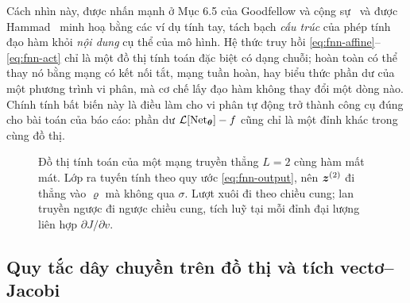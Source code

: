 Cách nhìn này, được nhấn mạnh ở Mục 6.5 của Goodfellow và cộng
sự~\cite{goodfellow2016} và được Hammad~\cite{hammad2024} minh hoạ bằng các ví
dụ tính tay, tách bạch \emph{cấu trúc} của phép tính đạo hàm khỏi \emph{nội
dung} cụ thể của mô hình. Hệ thức truy hồi
\eqref{eq:fnn-affine}--\eqref{eq:fnn-act} chỉ là một đồ thị tính toán đặc biệt có
dạng chuỗi; hoàn toàn có thể thay nó bằng mạng có kết nối tắt, mạng tuần hoàn,
hay biểu thức phần dư của một phương trình vi phân, mà cơ chế lấy đạo hàm không
thay đổi một dòng nào. Chính tính bất biến này là điều làm cho vi phân tự động
trở thành công cụ đúng cho bài toán của báo cáo: phần dư
$\mathcal{L}[\operatorname{Net}_{\bm{\theta}}] - f$ cũng chỉ là một đỉnh khác trong cùng đồ thị.
 
\begin{figure}[htbp]
\centering
{}
\caption{Đồ thị tính toán của một mạng truyền thẳng $L = 2$ cùng hàm mất mát.
Lớp ra tuyến tính theo quy ước \eqref{eq:fnn-output}, nên $\bm{z}^{(2)}$ đi thẳng
vào $\varrho$ mà không qua $\sigma$. Lượt xuôi đi theo chiều cung; lan truyền
ngược đi ngược chiều cung, tích luỹ tại mỗi đỉnh đại lượng liên hợp
$\partial J/\partial v$.}
\label{fig:comp-graph}
\end{figure}
 
\subsection{Quy tắc dây chuyền trên đồ thị và tích vectơ--Jacobi}
\label{subsec:vjp}
 

